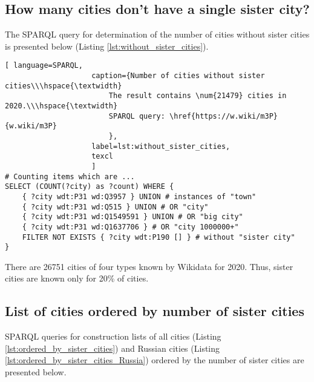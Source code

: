 \subsection{How many cities don't have a single sister city?}

The SPARQL query for determination of the number of cities without sister cities is presented below (Listing \ref{lst:without_sister_cities}).

\begin{lstlisting}[ language=SPARQL, 
                    caption={Number of cities without sister cities\\\hspace{\textwidth}
                        The result contains \num{21479} cities in 2020.\\\hspace{\textwidth}
                        SPARQL query: \href{https://w.wiki/m3P}{w.wiki/m3P}
                        },
                    label=lst:without_sister_cities,
                    texcl 
                    ]
# Counting items which are ... 
SELECT (COUNT(?city) as ?count) WHERE {                             
	{ ?city wdt:P31 wd:Q3957 } UNION # instances of "town"          
	{ ?city wdt:P31 wd:Q515 } UNION # OR "city"                 
	{ ?city wdt:P31 wd:Q1549591 } UNION # OR "big city"                       
	{ ?city wdt:P31 wd:Q1637706 } # OR "city 1000000+"              
	FILTER NOT EXISTS { ?city wdt:P190 [] } # without "sister city"
}
\end{lstlisting}%

There are 26751 cities of four types known by Wikidata for 2020. Thus, sister cities are known only for 20\% of cities.

\subsection{List of cities ordered by number of sister cities}

SPARQL queries for construction lists of all cities (Listing \ref{lst:ordered_by_sister_cities}) and Russian cities (Listing \ref{lst:ordered_by_sister_cities_Russia}) ordered by the number of sister cities are presented below.

